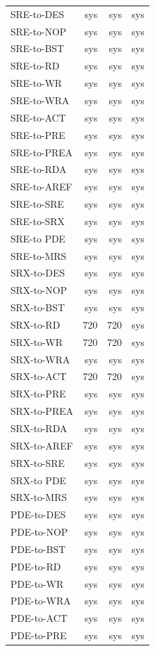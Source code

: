 {\begin{longtable}{@{}l r r r@{}}
SRE-to-DES & sys & sys & sys\\
SRE-to-NOP & sys & sys & sys\\
SRE-to-BST & sys & sys & sys\\
SRE-to-RD & sys & sys & sys\\
SRE-to-WR & sys & sys & sys\\
SRE-to-WRA & sys & sys & sys\\
SRE-to-ACT & sys & sys & sys\\
SRE-to-PRE & sys & sys & sys\\
SRE-to-PREA & sys & sys & sys\\
SRE-to-RDA & sys & sys & sys\\
SRE-to-AREF & sys & sys & sys\\
SRE-to-SRE & sys & sys & sys\\
SRE-to-SRX & sys & sys & sys\\
SRE-to PDE & sys & sys & sys\\
SRE-to-MRS & sys & sys & sys\\
SRX-to-DES & sys & sys & sys\\
SRX-to-NOP & sys & sys & sys\\
SRX-to-BST & sys & sys & sys\\
SRX-to-RD & 720 & 720 & sys\\
SRX-to-WR & 720 & 720 & sys\\
SRX-to-WRA & sys & sys & sys\\
SRX-to-ACT & 720 & 720 & sys\\
SRX-to-PRE & sys & sys & sys\\
SRX-to-PREA & sys & sys & sys\\
SRX-to-RDA & sys & sys & sys\\
SRX-to-AREF & sys & sys & sys\\
SRX-to-SRE & sys & sys & sys\\
SRX-to PDE & sys & sys & sys\\
SRX-to-MRS & sys & sys & sys\\
PDE-to-DES & sys & sys & sys\\
PDE-to-NOP & sys & sys & sys\\
PDE-to-BST & sys & sys & sys\\
PDE-to-RD & sys & sys & sys\\
PDE-to-WR & sys & sys & sys\\
PDE-to-WRA & sys & sys & sys\\
PDE-to-ACT & sys & sys & sys\\
PDE-to-PRE & sys & sys & sys\\

\end{longtable}}
